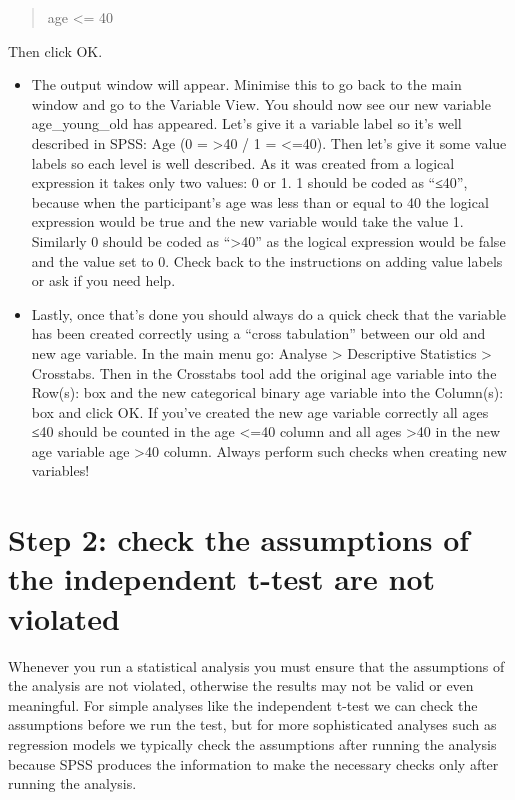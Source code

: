 \documentclass[
]{book}
\begin{document}
\begin{quote}
age \textless= 40
\end{quote}

Then click OK.

\begin{itemize}
\item
  The output window will appear. Minimise this to go back to the main window and go to the Variable View. You should now see our new variable age\_young\_old has appeared. Let's give it a variable label so it's well described in SPSS: Age (0 = \textgreater40 / 1 = \textless=40). Then let's give it some value labels so each level is well described. As it was created from a logical expression it takes only two values: 0 or 1. 1 should be coded as ``≤40'', because when the participant's age was less than or equal to 40 the logical expression would be true and the new variable would take the value 1. Similarly 0 should be coded as ``\textgreater40'' as the logical expression would be false and the value set to 0. Check back to the instructions on adding value labels or ask if you need help.
\item
  Lastly, once that's done you should always do a quick check that the variable has been created correctly using a ``cross tabulation'' between our old and new age variable. In the main menu go: Analyse \textgreater{} Descriptive Statistics \textgreater{} Crosstabs. Then in the Crosstabs tool add the original age variable into the Row(s): box and the new categorical binary age variable into the Column(s): box and click OK. If you've created the new age variable correctly all ages ≤40 should be counted in the age \textless=40 column and all ages \textgreater40 in the new age variable age \textgreater40 column. Always perform such checks when creating new variables!
\end{itemize}

\hypertarget{step-2-check-the-assumptions-of-the-independent-t-test-are-not-violated}{%
\section{Step 2: check the assumptions of the independent t-test are not violated}\label{step-2-check-the-assumptions-of-the-independent-t-test-are-not-violated}}

Whenever you run a statistical analysis you must ensure that the assumptions of the analysis are not violated, otherwise the results may not be valid or even meaningful. For simple analyses like the independent t-test we can check the assumptions before we run the test, but for more sophisticated analyses such as regression models we typically check the assumptions after running the analysis because SPSS produces the information to make the necessary checks only after running the analysis.
\end{document}
